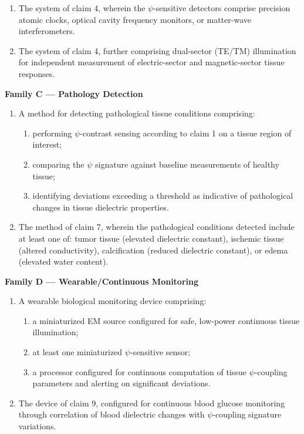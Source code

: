 \documentclass[12pt,letterpaper]{article}
\begin{document}
\begin{tcolorbox}[colback=blue!5!white, colframe=blue!50!black,
title=Patent \#18 -- Proposed Claims]
\begin{enumerate}[resume]
\item The system of claim 4, wherein the $\psi$-sensitive detectors
comprise precision atomic clocks, optical cavity frequency monitors,
or matter-wave interferometers.

\item The system of claim 4, further comprising dual-sector (TE/TM)
illumination for independent measurement of electric-sector and
magnetic-sector tissue responses.
\end{enumerate}

\textbf{Family C --- Pathology Detection}
\begin{enumerate}[resume]
\item A method for detecting pathological tissue conditions comprising:
\begin{enumerate}[label=(\alph*)]
\item performing $\psi$-contrast sensing according to claim 1 on a
tissue region of interest;
\item comparing the $\psi$ signature against baseline measurements of
healthy tissue;
\item identifying deviations exceeding a threshold as indicative of
pathological changes in tissue dielectric properties.
\end{enumerate}

\item The method of claim 7, wherein the pathological conditions
detected include at least one of: tumor tissue (elevated dielectric
constant), ischemic tissue (altered conductivity), calcification
(reduced dielectric constant), or edema (elevated water content).
\end{enumerate}

\textbf{Family D --- Wearable/Continuous Monitoring}
\begin{enumerate}[resume]
\item A wearable biological monitoring device comprising:
\begin{enumerate}[label=(\alph*)]
\item a miniaturized EM source configured for safe, low-power
continuous tissue illumination;
\item at least one miniaturized $\psi$-sensitive sensor;
\item a processor configured for continuous computation of
tissue $\psi$-coupling parameters and alerting on significant
deviations.
\end{enumerate}

\item The device of claim 9, configured for continuous blood glucose
monitoring through correlation of blood dielectric changes with
$\psi$-coupling signature variations.
\end{enumerate}
\end{tcolorbox}
\end{document}

